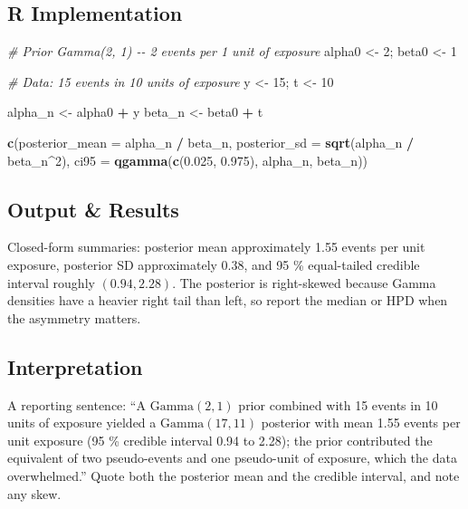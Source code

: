 \documentclass[
]{article}
\newenvironment{Shaded}{\begin{snugshade}}{\end{snugshade}}
\newcommand{\AttributeTok}[1]{\textcolor[rgb]{0.13,0.29,0.53}{#1}}
\newcommand{\CommentTok}[1]{\textcolor[rgb]{0.56,0.35,0.01}{\textit{#1}}}
\newcommand{\DecValTok}[1]{\textcolor[rgb]{0.00,0.00,0.81}{#1}}
\newcommand{\FloatTok}[1]{\textcolor[rgb]{0.00,0.00,0.81}{#1}}
\newcommand{\FunctionTok}[1]{\textcolor[rgb]{0.13,0.29,0.53}{\textbf{#1}}}
\newcommand{\NormalTok}[1]{#1}
\newcommand{\OtherTok}[1]{\textcolor[rgb]{0.56,0.35,0.01}{#1}}
\newcommand{\SpecialCharTok}[1]{\textcolor[rgb]{0.81,0.36,0.00}{\textbf{#1}}}
\begin{document}
\subsection{R Implementation}\label{r-implementation}

\begin{Shaded}
\begin{Highlighting}[]
\CommentTok{\# Prior Gamma(2, 1) {-}{-} 2 events per 1 unit of exposure}
\NormalTok{alpha0 }\OtherTok{\textless{}{-}} \DecValTok{2}\NormalTok{; beta0 }\OtherTok{\textless{}{-}} \DecValTok{1}

\CommentTok{\# Data: 15 events in 10 units of exposure}
\NormalTok{y }\OtherTok{\textless{}{-}} \DecValTok{15}\NormalTok{; t }\OtherTok{\textless{}{-}} \DecValTok{10}

\NormalTok{alpha\_n }\OtherTok{\textless{}{-}}\NormalTok{ alpha0 }\SpecialCharTok{+}\NormalTok{ y}
\NormalTok{beta\_n  }\OtherTok{\textless{}{-}}\NormalTok{ beta0 }\SpecialCharTok{+}\NormalTok{ t}

\FunctionTok{c}\NormalTok{(}\AttributeTok{posterior\_mean =}\NormalTok{ alpha\_n }\SpecialCharTok{/}\NormalTok{ beta\_n,}
  \AttributeTok{posterior\_sd   =} \FunctionTok{sqrt}\NormalTok{(alpha\_n }\SpecialCharTok{/}\NormalTok{ beta\_n}\SpecialCharTok{\^{}}\DecValTok{2}\NormalTok{),}
  \AttributeTok{ci95 =} \FunctionTok{qgamma}\NormalTok{(}\FunctionTok{c}\NormalTok{(}\FloatTok{0.025}\NormalTok{, }\FloatTok{0.975}\NormalTok{), alpha\_n, beta\_n))}
\end{Highlighting}
\end{Shaded}

\subsection{Output \& Results}\label{output-results}

Closed-form summaries: posterior mean approximately 1.55 events per unit
exposure, posterior SD approximately 0.38, and 95 \% equal-tailed
credible interval roughly \((0.94, 2.28)\). The posterior is
right-skewed because Gamma densities have a heavier right tail than
left, so report the median or HPD when the asymmetry matters.

\subsection{Interpretation}\label{interpretation}

A reporting sentence: ``A \(\mathrm{Gamma}(2, 1)\) prior combined with
15 events in 10 units of exposure yielded a \(\mathrm{Gamma}(17, 11)\)
posterior with mean 1.55 events per unit exposure (95 \% credible
interval 0.94 to 2.28); the prior contributed the equivalent of two
pseudo-events and one pseudo-unit of exposure, which the data
overwhelmed.'' Quote both the posterior mean and the credible interval,
and note any skew.
\end{document}
